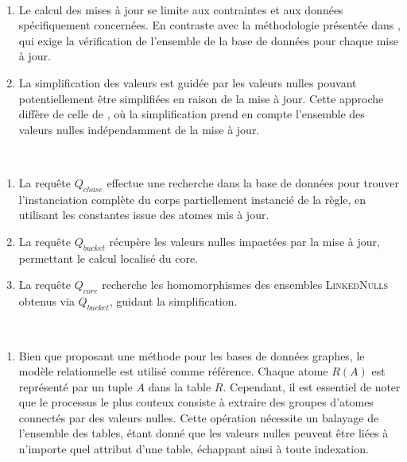 \begin{description}[wide=0pt]
    \item[Incrémentalité] ~
          \begin{enumerate}
              \item Le calcul des mises à jour se limite aux contraintes et aux données spécifiquement concernées.
                    En contraste avec la méthodologie présentée dans \cite{chabinConsistentUpdatingDatabases2020}, qui exige la vérification de l'ensemble de la base de données pour chaque mise à jour.

              \item La simplification des valeurs est guidée par les valeurs nulles pouvant potentiellement être simplifiées en raison de la mise à jour.
                    Cette approche diffère de celle de \cite{chabinConsistentUpdatingDatabases2020}, où la simplification prend en compte l'ensemble des valeurs nulles indépendamment de la mise à jour.
          \end{enumerate}

    \item[Requêtes] ~
          \begin{enumerate}
              \item La requête $Q_{chase}$ effectue une recherche dans la base de données pour trouver l'instanciation complète du corps partiellement instancié de la règle, en utilisant les constantes issue des atomes mis à jour.

              \item La requête $Q_{bucket}$ récupère les valeurs nulles impactées par la mise à jour, permettant le calcul localisé du \gls{core}.

              \item La requête $Q_{core}$ recherche les homomorphismes des ensembles \textsc{LinkedNulls} obtenus via $Q_{bucket}$, guidant la simplification.
          \end{enumerate}

    \item[SGBDs] ~
          \begin{enumerate}
              \item Bien que proposant une méthode pour les bases de données graphes, le modèle relationnelle est utilisé comme référence.
                    Chaque atome $R(A)$ est représenté par un tuple $A$ dans la table $R$.
                    Cependant, il est essentiel de noter que le processus le plus couteux consiste à extraire des groupes d'atomes connectés par des valeurs nulles.
                    Cette opération nécessite un balayage de l'ensemble des tables, étant donné que les valeurs nulles peuvent être liées à n'importe quel attribut d'une table, échappant ainsi à toute indexation.


\end{enumerate}
\end{description}
